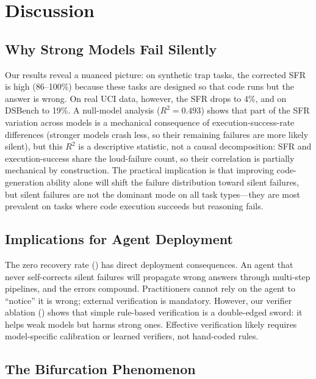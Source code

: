 \section{Discussion}
\label{sec:disc}

\subsection{Why Strong Models Fail Silently}
\label{sec:disc-why}

Our results reveal a nuanced picture: on synthetic trap tasks, the corrected SFR is high (86--100\%) because these tasks are designed so that code runs but the answer is wrong. On real UCI data, however, the SFR drops to 4\%, and on DSBench to 19\%. A null-model analysis ($R^2 = 0.493$) shows that part of the SFR variation across models is a mechanical consequence of execution-success-rate differences (stronger models crash less, so their remaining failures are more likely silent), but this $R^2$ is a descriptive statistic, not a causal decomposition: SFR and execution-success share the loud-failure count, so their correlation is partially mechanical by construction. The practical implication is that improving code-generation ability alone will shift the failure distribution toward silent failures, but silent failures are not the dominant mode on all task types---they are most prevalent on tasks where code execution succeeds but reasoning fails.

\subsection{Implications for Agent Deployment}
\label{sec:disc-impl}

The zero recovery rate () has direct deployment consequences. An agent that never self-corrects silent failures will propagate wrong answers through multi-step pipelines, and the errors compound. Practitioners cannot rely on the agent to ``notice'' it is wrong; external verification is mandatory. However, our verifier ablation () shows that simple rule-based verification is a double-edged sword: it helps weak models but harms strong ones. Effective verification likely requires model-specific calibration or learned verifiers, not hand-coded rules.

\subsection{The Bifurcation Phenomenon}
\label{sec:disc-bifurcation}

